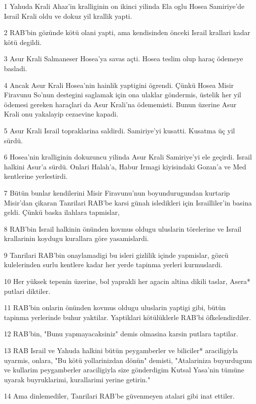 \par 1 Yahuda Krali Ahaz'in kralliginin on ikinci yilinda Ela oglu Hosea Samiriye'de Israil Krali oldu ve dokuz yil krallik yapti.
\par 2 RAB'bin gözünde kötü olani yapti, ama kendisinden önceki Israil krallari kadar kötü degildi.
\par 3 Asur Krali Salmaneser Hosea'ya savas açti. Hosea teslim olup haraç ödemeye basladi.
\par 4 Ancak Asur Krali Hosea'nin hainlik yaptigini ögrendi. Çünkü Hosea Misir Firavunu So'nun destegini saglamak için ona ulaklar göndermis, üstelik her yil ödemesi gereken haraçlari da Asur Krali'na ödememisti. Bunun üzerine Asur Krali onu yakalayip cezaevine kapadi.
\par 5 Asur Krali Israil topraklarina saldirdi. Samiriye'yi kusatti. Kusatma üç yil sürdü.
\par 6 Hosea'nin kralliginin dokuzuncu yilinda Asur Krali Samiriye'yi ele geçirdi. Israil halkini Asur'a sürdü. Onlari Halah'a, Habur Irmagi kiyisindaki Gozan'a ve Med kentlerine yerlestirdi.
\par 7 Bütün bunlar kendilerini Misir Firavunu'nun boyundurugundan kurtarip Misir'dan çikaran Tanrilari RAB'be karsi günah isledikleri için Israilliler'in basina geldi. Çünkü baska ilahlara tapmislar,
\par 8 RAB'bin Israil halkinin önünden kovmus oldugu uluslarin törelerine ve Israil krallarinin koydugu kurallara göre yasamislardi.
\par 9 Tanrilari RAB'bin onaylamadigi bu isleri gizlilik içinde yapmislar, gözcü kulelerinden surlu kentlere kadar her yerde tapinma yerleri kurmuslardi.
\par 10 Her yüksek tepenin üzerine, bol yaprakli her agacin altina dikili taslar, Asera* putlari diktiler.
\par 11 RAB'bin onlarin önünden kovmus oldugu uluslarin yaptigi gibi, bütün tapinma yerlerinde buhur yaktilar. Yaptiklari kötülüklerle RAB'bi öfkelendirdiler.
\par 12 RAB'bin, "Bunu yapmayacaksiniz" demis olmasina karsin putlara taptilar.
\par 13 RAB Israil ve Yahuda halkini bütün peygamberler ve biliciler* araciligiyla uyarmis, onlara, "Bu kötü yollarinizdan dönün" demisti, "Atalariniza buyurdugum ve kullarim peygamberler araciligiyla size gönderdigim Kutsal Yasa'nin tümüne uyarak buyruklarimi, kurallarimi yerine getirin."
\par 14 Ama dinlemediler, Tanrilari RAB'be güvenmeyen atalari gibi inat ettiler.
